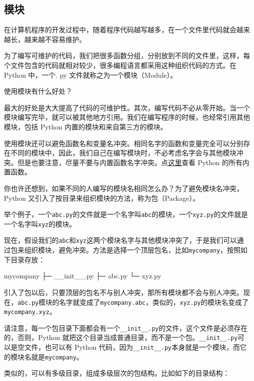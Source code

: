 \hypertarget{ux6a21ux5757}{%
\subsection{模块}\label{ux6a21ux5757}}

在计算机程序的开发过程中，随着程序代码越写越多，在一个文件里代码就会越来越长，越来越不容易维护。

为了编写可维护的代码，我们把很多函数分组，分别放到不同的文件里，这样，每个文件包含的代码就相对较少，很多编程语言都采用这种组织代码的方式。在
Python 中，一个. py 文件就称之为一个模块（Module）。

使用模块有什么好处？

最大的好处是大大提高了代码的可维护性。其次，编写代码不必从零开始。当一个模块编写完毕，就可以被其他地方引用。我们在编写程序的时候，也经常引用其他模块，包括
Python 内置的模块和来自第三方的模块。

使用模块还可以避免函数名和变量名冲突。相同名字的函数和变量完全可以分别存在不同的模块中，因此，我们自己在编写模块时，不必考虑名字会与其他模块冲突。但是也要注意，尽量不要与内置函数名字冲突。点\href{http://docs.python.org/3/library/functions.html}{这里}查看
Python 的所有内置函数。

你也许还想到，如果不同的人编写的模块名相同怎么办？为了避免模块名冲突，Python
又引入了按目录来组织模块的方法，称为包（Package）。

举个例子，一个\texttt{abc.py}的文件就是一个名字叫\texttt{abc}的模块，一个\texttt{xyz.py}的文件就是一个名字叫\texttt{xyz}的模块。

现在，假设我们的\texttt{abc}和\texttt{xyz}这两个模块名字与其他模块冲突了，于是我们可以通过包来组织模块，避免冲突。方法是选择一个顶层包名，比如\texttt{mycompany}，按照如下目录存放：

\begin{pythoncode}
mycompany
├─ __init__.py
├─ abc.py
└─ xyz.py
\end{pythoncode}

引入了包以后，只要顶层的包名不与别人冲突，那所有模块都不会与别人冲突。现在，\texttt{abc.py}模块的名字就变成了\texttt{mycompany.abc}，类似的，\texttt{xyz.py}的模块名变成了\texttt{mycompany.xyz}。

请注意，每一个包目录下面都会有一个\texttt{\_\_init\_\_.py}的文件，这个文件是必须存在的，否则，Python
就把这个目录当成普通目录，而不是一个包。\texttt{\_\_init\_\_.py}可以是空文件，也可以有
Python
代码，因为\texttt{\_\_init\_\_.py}本身就是一个模块，而它的模块名就是\texttt{mycompany}。

类似的，可以有多级目录，组成多级层次的包结构。比如如下的目录结构：


